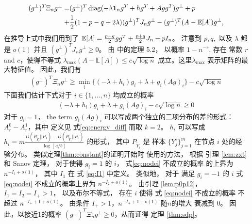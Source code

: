 \begin{align*}
    (g^{\perp})^T \Xi_n g^{\perp} 
    =& (g^{\perp})^T \operatorname{diag}( -\lambda \mathbf{1}_ng^T+hg^T + Agg^T) g^{\perp} + p \\
    +& \frac{1}{2}(1-p-q+2\lambda)(g^{\perp})^TJ_n g^{\perp}
    -(g^{\perp})^T(A-\operatorname{\mathbb{E}}[A])g^{\perp},
\end{align*}
在推导上式中我们用到了 $\operatorname{\mathbb{E}}[A] = \frac{p-q}{2}gg^T + \frac{p+q}{2}J_n - pI_n$。
注意到 $p,q,$ 以及 $\lambda$ 都是 $o(1)$ 并且
$(g^{\perp})^TJ_n g^{\perp}\ge 0$。
由 \citet{lei2015consistency} 中的定理 5.2，
以概率 $1-n^{-r}$, 存在
常数 $r$ and $c$，使得不等式 $\lambda_{\max}(A-\mathbb{E}[A]) \leq c\sqrt{\log n}$
成立。这里$\lambda_{\max}$ 表示矩阵的最大特征值。
因此，我们有
\begin{align}\label{eq:lastterm}
    (g^{\perp})^T \Xi_n g^{\perp} \geq \min_i\{(-\lambda + h_i) g_i+\lambda + g_i (Ag)_i \} - c \sqrt{\log n}
\end{align}
下面我们估计下式对于 $i\in\{1,\ldots,n\}$ 均成立的概率
\begin{align}\label{eq:nodei}
    (-\lambda + h_i) g_i+\lambda + g_i (Ag)_i  - c \sqrt{\log n}\ge 0
\end{align}
对于 $g_i=1$，
the term $g_i(Ag)_i$ 可以写成两个独立的二项分布的差的形式：
$A_r^0-A_r^1$，其中 定义见 式\eqref{eq:energy_diff} 而取 $k=2$。
$h_i$ 可以写成 $h_i=m \frac{D(P_{\widetilde{Y}_i} || P_1) - D(P_{\widetilde{Y}_i} || P_0) }{\log (a /b)}$
的形式，
其中 $P_{\widetilde{Y}_i}$ 是
样本 $\{Y^i_j\}^m_{j=1}$ 在节点 $i$ 处的经验分布。
类似定理\ref{thm:constant}的证明开始时
使用的方法，
根据 引理 \ref{lem:zxt} 和  Sanov 定理，
对于使得 $g_i=1$ 的 $i$， 
式\eqref{eq:nodei} 不成立的概率
的上界为
$n^{-I_1 + o(1)}$，
其中 $I_1$ 在 式 \eqref{eq:I1} 中定义。
类似地，
对于 满足 $g_i=-1$ 的  $i$
式 \eqref{eq:nodei} 不成立的概率上界为 
$n^{-I_2 + o(1)}$。
由引理 \ref{lem:p0p12}，$I_1=I_2=I_+>1$，
以及布尔不等式，  存在 $i$ 使得 式 \eqref{eq:nodei} 不成立的概率 不超过 $n^{-I_+ + 1 + o(1)}$。
由条件 $I_+>1$，$n^{-I_+ + 1 + o(1)}$ 随$n$的增大 衰减到 $0$。
 因此，以接近1的概率 $(g^{\perp})^T \Xi_n g^{\perp}\ge 0$，从而证得 定理 \ref{thm:sdp}。 

